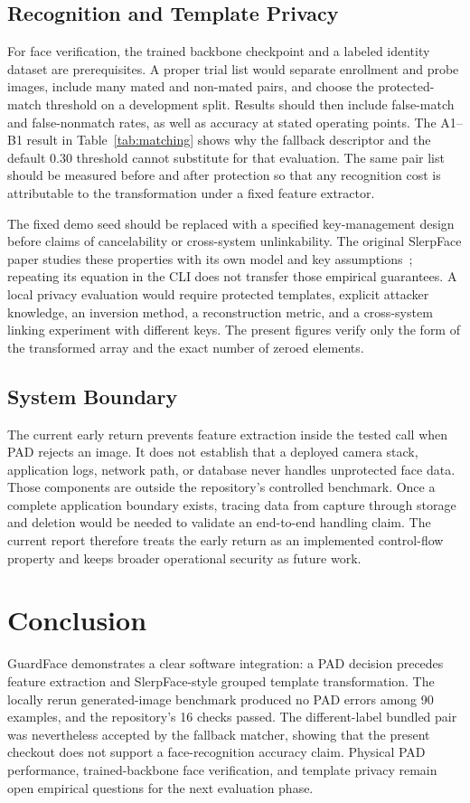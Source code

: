 \documentclass[conference,10pt]{IEEEtran}
\begin{document}
\subsection{Recognition and Template Privacy}
For face verification, the trained backbone checkpoint and a labeled identity dataset are prerequisites. A proper trial list would separate enrollment and probe images, include many mated and non-mated pairs, and choose the protected-match threshold on a development split. Results should then include false-match and false-nonmatch rates, as well as accuracy at stated operating points. The A1--B1 result in Table~\ref{tab:matching} shows why the fallback descriptor and the default 0.30 threshold cannot substitute for that evaluation. The same pair list should be measured before and after protection so that any recognition cost is attributable to the transformation under a fixed feature extractor.

The fixed demo seed should be replaced with a specified key-management design before claims of cancelability or cross-system unlinkability. The original SlerpFace paper studies these properties with its own model and key assumptions~\cite{slerpface}; repeating its equation in the CLI does not transfer those empirical guarantees. A local privacy evaluation would require protected templates, explicit attacker knowledge, an inversion method, a reconstruction metric, and a cross-system linking experiment with different keys. The present figures verify only the form of the transformed array and the exact number of zeroed elements.

\subsection{System Boundary}
The current early return prevents feature extraction inside the tested call when PAD rejects an image. It does not establish that a deployed camera stack, application logs, network path, or database never handles unprotected face data. Those components are outside the repository's controlled benchmark. Once a complete application boundary exists, tracing data from capture through storage and deletion would be needed to validate an end-to-end handling claim. The current report therefore treats the early return as an implemented control-flow property and keeps broader operational security as future work.

\section{Conclusion}
GuardFace demonstrates a clear software integration: a PAD decision precedes feature extraction and SlerpFace-style grouped template transformation. The locally rerun generated-image benchmark produced no PAD errors among 90 examples, and the repository's 16 checks passed. The different-label bundled pair was nevertheless accepted by the fallback matcher, showing that the present checkout does not support a face-recognition accuracy claim. Physical PAD performance, trained-backbone face verification, and template privacy remain open empirical questions for the next evaluation phase.
\end{document}
